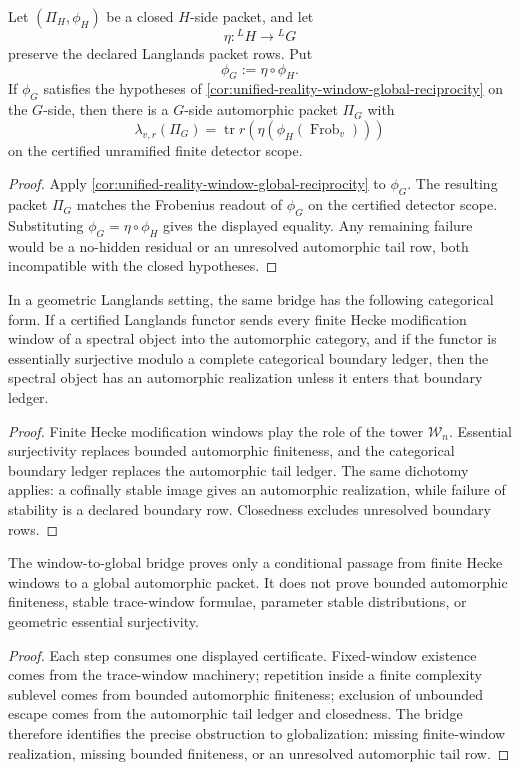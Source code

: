 \begin{theorem}
\label{thm:unified-reality-functorial-window-global-transfer}
Let $(\Pi_H,\phi_H)$ be a closed $H$-side packet, and let
$$
\eta:{}^LH\to{}^LG
$$
preserve the declared Langlands packet rows. Put
$$
\phi_G:=\eta\circ\phi_H.
$$
If $\phi_G$ satisfies the hypotheses of
\autoref{cor:unified-reality-window-global-reciprocity} on the $G$-side,
then there is a $G$-side automorphic packet $\Pi_G$ with
$$
\lambda_{v,r}(\Pi_G)
=
\operatorname{tr}r(\eta(\phi_H(\operatorname{Frob}_v)))
$$
on the certified unramified finite detector scope.
\end{theorem}
\begin{proof}
Apply
\autoref{cor:unified-reality-window-global-reciprocity} to
$\phi_G$. The resulting packet $\Pi_G$ matches the Frobenius readout of
$\phi_G$ on the certified detector scope. Substituting
$\phi_G=\eta\circ\phi_H$ gives the displayed equality. Any remaining
failure would be a no-hidden residual or an unresolved automorphic tail
row, both incompatible with the closed hypotheses.
\end{proof}

\begin{theorem}
\label{thm:unified-reality-categorical-window-global-analogue}
In a geometric Langlands setting, the same bridge has the following
categorical form. If a certified Langlands functor sends every finite
Hecke modification window of a spectral object into the automorphic
category, and if the functor is essentially surjective modulo a complete
categorical boundary ledger, then the spectral object has an
automorphic realization unless it enters that boundary ledger.
\end{theorem}
\begin{proof}
Finite Hecke modification windows play the role of the tower
$\mathcal W_n$. Essential surjectivity replaces bounded automorphic
finiteness, and the categorical boundary ledger replaces the
automorphic tail ledger. The same dichotomy applies: a cofinally stable
image gives an automorphic realization, while failure of stability is a
declared boundary row. Closedness excludes unresolved boundary rows.
\end{proof}

\begin{theorem}
\label{thm:unified-reality-window-global-boundary}
The window-to-global bridge proves only a conditional passage from
finite Hecke windows to a global automorphic packet. It does not prove
bounded automorphic finiteness, stable trace-window formulae, parameter
stable distributions, or geometric essential surjectivity.
\end{theorem}
\begin{proof}
Each step consumes one displayed certificate. Fixed-window existence
comes from the trace-window machinery; repetition inside a finite
complexity sublevel comes from bounded automorphic finiteness; exclusion
of unbounded escape comes from the automorphic tail ledger and
closedness. The bridge therefore identifies the precise obstruction to
globalization: missing finite-window realization, missing bounded
finiteness, or an unresolved automorphic tail row.
\end{proof}
